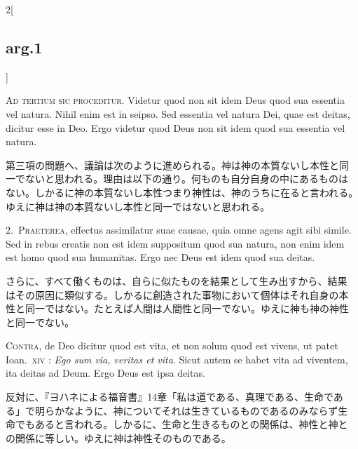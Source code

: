 \documentclass[paper=a4paper,fontsize=10pt,jafontsize=9pt,titlepage]{jlreq}
\begin{document}
\begin{paracol}{2}[\subsection{arg.1}]

\textsc{Ad tertium sic proceditur}. Videtur quod non sit idem Deus
quod sua essentia vel natura. Nihil enim est in seipso. Sed essentia
vel natura Dei, quae est deitas, dicitur esse in Deo. Ergo videtur
quod Deus non sit idem quod sua essentia vel natura.

\switchcolumn

第三項の問題へ、議論は次のように進められる。神は神の本質ないし本性と同
一でないと思われる。理由は以下の通り。何ものも自分自身の中にあるものは
ない。しかるに神の本質ないし本性つまり神性は、神のうちに在ると言われる。
ゆえに神は神の本質ないし本性と同一ではないと思われる。


2.~\textsc{Praeterea}, effectus assimilatur suae causae, quia omne
agens agit sibi simile. Sed in rebus creatis non est idem suppositum
quod sua natura, non enim idem est homo quod sua humanitas. Ergo nec
Deus est idem quod sua deitas.

\switchcolumn

さらに、すべて働くものは、自らに似たものを結果として生み出すから、結果
はその原因に類似する。しかるに創造された事物において個体はそれ自身の本
性と同一ではない。たとえば人間は人間性と同一でない。ゆえに神も神の神性
と同一でない。

\switchcolumn*[\subsection{s.c.}]

\textsc{Contra}, de Deo dicitur quod est vita, et non solum quod est
vivens, ut patet Ioan.~\textsc{xiv} : \textit{Ego sum via, veritas et
vita}. Sicut autem se habet vita ad viventem, ita deitas ad Deum. Ergo
Deus est ipsa deitas.

\switchcolumn

反対に、『ヨハネによる福音書』14章「私は道である、真理である、生命であ
る」で明らかなように、神についてそれは生きているものであるのみならず生
命でもあると言われる。しかるに、生命と生きるものとの関係は、神性と神と
の関係に等しい。ゆえに神は神性そのものである。


\end{paracol}
\end{document}
